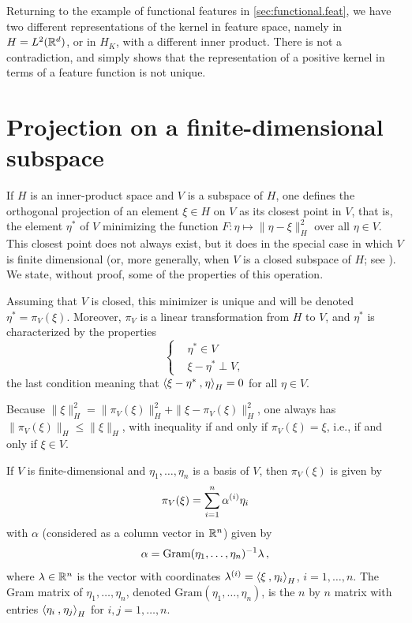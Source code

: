 
Returning to the example of functional features in \cref{sec:functional.feat}, we have two different representations of the kernel in feature space, namely in $H = L^2({\mathbb{R}}^d)$, or in $H_K$, with a different inner product. There is not a contradiction, and simply shows that the representation of a positive kernel in terms of a feature function is not unique. 


\section{Projection on a finite-dimensional subspace}
\label{sec:orth.proj}
 If $H$ is an inner-product space and $V$ is a subspace of $H$, one defines the orthogonal projection of an element $\xi\in H$ on $V$ as its closest point in $V$, that is, the element $\eta^*$ of $V$ minimizing  the function $F: \eta \mapsto \| \eta - \xi\|^2_H$ over all $\eta\in V$. This closest point does not always exist, but it does in the special case in which $V$ is finite dimensional (or, more generally, when $V$ is a closed subspace of $H$; see \citet{yos70}). We state, without proof, some of the properties of this operation.
 
Assuming that $V$ is closed,  this minimizer is unique and will be denoted $\eta^* = \pi_V(\xi)$. Moreover, $\pi_V$ is a linear transformation from $H$ to $V$, and $\eta^*$ is characterized by the properties
 \[
 \left\{ \begin{aligned} &\eta^*\in V \\ &\xi-\eta^* \perp V,\end{aligned}
 \right.
 \]
 the last condition meaning that ${\langle {\xi-\eta^*}\mathbin{,} {\eta}\rangle}_H = 0$ for all $\eta\in V$.
 
 Because $\|\xi\|_H^2 = \|\pi_V(\xi)\|_H^2 + \|\xi- \pi_V(\xi)\|_H^2$, one always has $\|\pi_V(\xi)\|_H \leq \|\xi\|_H$, with inequality if and only if $\pi_V(\xi) = \xi$, i.e., if and only if $\xi\in V$.

 
 If $V$ is finite-dimensional and $\eta_1, \ldots, \eta_n$ is a basis of $V$, then $\pi_V(\xi)$ is given by
 \[
 \pi_V(\xi) = \sum_{i=1}^n \alpha^{(i)} \eta_i
 \]
 with $\alpha$ (considered as a column vector in ${\mathbb{R}}^n$) given by
 \[
 \alpha = \mathrm{Gram}(\eta_1, \ldots, \eta_n)^{-1} \lambda\,,
 \]
 where $\lambda\in{\mathbb{R}}^n$ is the vector with coordinates $\lambda^{(i)} = {\langle {\xi}\mathbin{,} {\eta_i}\rangle}_H$, $i=1, \ldots, n$. The Gram matrix of $\eta_1, \ldots, \eta_n$, denoted $\mathrm{Gram}(\eta_1, \ldots, \eta_n)$, is the $n$ by $n$ matrix with entries ${\langle {\eta_i}\mathbin{,} {\eta_j}\rangle}_H$ for $i,j = 1, \ldots, n$. 
 

